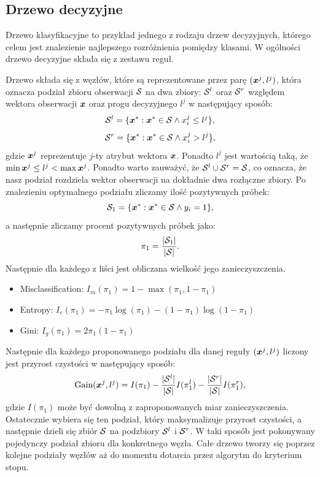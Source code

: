 \documentclass[inzynierska]{pwr_wmat_praca_dyplomowa}
\theoremstyle{plain}
\numberwithin{theorem}{chapter}
\theoremstyle{definition}
\numberwithin{theorem}{chapter}
\begin{document}
\subsection{Drzewo decyzyjne}
\label{drzewo}

Drzewo klasyfikacyjne to przykład jednego z rodzaju drzew decyzyjnych, którego celem jest znalezienie najlepszego rozróżnienia pomiędzy klasami. W ogólności drzewo decyzyjne składa się z zestawu reguł.

Drzewo składa się z węzłów, które są reprezentowane przez parę $(\boldsymbol{x}^j, l^j)$, która oznacza podział zbioru obserwacji $\mathcal{S}$ na dwa zbiory: $\mathcal{S}^{l}$ oraz $\mathcal{S}^{r}$ względem wektora obserwacji $\boldsymbol{x}$ oraz progu decyzyjnego $l^j$ w następujący sposób:
$$ \mathcal{S}^l = \{ \boldsymbol{x}^* : \boldsymbol{x}^* \in \mathcal{S} \land x^j_i \leq l^j \} \text{,} $$
$$ \mathcal{S}^r = \{ \boldsymbol{x}^* : \boldsymbol{x}^* \in \mathcal{S} \land x^j_i > l^j \} \text{,} $$
gdzie $\boldsymbol{x}^j$ reprezentuje $j$-ty atrybut wektora $\boldsymbol{x}$. Ponadto $l^j$ jest wartością taką, że $\min{\boldsymbol{x}^j} \leq l^j < \max{\boldsymbol{x}^j}$. Ponadto warto zauważyć, że $\mathcal{S}^l \cup \mathcal{S}^r = \mathcal{S}$, co oznacza, że nasz podział rozdziela wektor obserwacji na dokładnie dwa rozłączne zbiory.
Po znalezieniu optymalnego podziału zliczamy ilość pozytywnych próbek:
$$ \mathcal{S}_1  = \{ \boldsymbol{x}^* : \boldsymbol{x}^* \in \mathcal{S} \land y_i = 1 \} \text{,} $$
a następnie zliczamy procent pozytywnych próbek jako:
$$ \pi_1 = \frac{|\mathcal{S}_1|}{|\mathcal{S}|} \text{.}$$
Następnie dla każdego z liści jest obliczana wielkość jego zanieczyszczenia.
\begin{itemize}
	\item Misclassification: $I_m(\pi_1) = 1 - \max(\pi_1, 1 - \pi_1)$
	\item Entropy: $I_e(\pi_1) = -\pi_1 \log(\pi_1) - (1 - \pi_1) \log (1 - \pi_1)$
	\item Gini: $I_g(\pi_1) = 2 \pi_1 (1 - \pi_1)$
\end{itemize}{}
Następnie dla każdego proponowanego podziału dla danej reguły $(\boldsymbol{x}^j, l^j)$ liczony jest przyrost czystości w następujący sposób:
$$ \text{Gain}(\boldsymbol{x}^j, l^j) = I(\pi_1) - \frac{|\mathcal{S}^l|}{|\mathcal{S}|} I(\pi_1^l) - \frac{|\mathcal{S}^r|}{|\mathcal{S}|} I(\pi_1^r) \text{,}$$
gdzie $I(\pi_1)$ może być dowolną z zaproponowanych miar zanieczyszczenia.
Ostatecznie wybiera się ten podział, który maksymalizuje przyrost czystości, a następnie dzieli się zbiór $\mathcal{S}$ na podzbiory $\mathcal{S}^l$ i $\mathcal{S}^r$.
W taki sposób jest pokonywany pojedynczy podział zbioru dla konkretnego węzła. Całe drzewo tworzy się poprzez kolejne podziały węzłów aż do momentu dotarcia przez algorytm do kryterium stopu.
\end{document}
